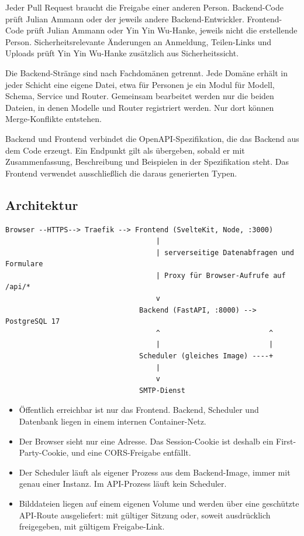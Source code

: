 \documentclass[11pt,a4paper]{article}
\renewcommand{\footnotesize}{\fontsize{10}{12}\selectfont}
\begin{document}
Jeder Pull Request braucht die Freigabe einer anderen Person. Backend-Code prüft Julian Ammann oder der jeweils andere Backend-Entwickler. Frontend-Code prüft Julian Ammann oder Yin Yin Wu-Hanke, jeweils nicht die erstellende Person. Sicherheitsrelevante Änderungen an Anmeldung, Teilen-Links und Uploads prüft Yin Yin Wu-Hanke zusätzlich aus Sicherheitssicht.

Die Backend-Stränge sind nach Fachdomänen getrennt. Jede Domäne erhält in jeder Schicht eine eigene Datei, etwa für Personen je ein Modul für Modell, Schema, Service und Router. Gemeinsam bearbeitet werden nur die beiden Dateien, in denen Modelle und Router registriert werden. Nur dort können Merge-Konflikte entstehen.

Backend und Frontend verbindet die OpenAPI-Spezifikation, die das Backend aus dem Code erzeugt. Ein Endpunkt gilt als übergeben, sobald er mit Zusammenfassung, Beschreibung und Beispielen in der Spezifikation steht. Das Frontend verwendet ausschließlich die daraus generierten Typen.

\subsection{Architektur}

{\footnotesize
\begin{verbatim}
Browser --HTTPS--> Traefik --> Frontend (SvelteKit, Node, :3000)
                                    |
                                    | serverseitige Datenabfragen und Formulare
                                    | Proxy für Browser-Aufrufe auf /api/*
                                    v
                                Backend (FastAPI, :8000) --> PostgreSQL 17
                                    ^                          ^
                                    |                          |
                                Scheduler (gleiches Image) ----+
                                    |
                                    v
                                SMTP-Dienst
\end{verbatim}
}

\begin{itemize}
\item Öffentlich erreichbar ist nur das Frontend. Backend, Scheduler und Datenbank liegen in einem internen Container-Netz.
\item Der Browser sieht nur eine Adresse. Das Session-Cookie ist deshalb ein First-Party-Cookie, und eine CORS-Freigabe entfällt.
\item Der Scheduler läuft als eigener Prozess aus dem Backend-Image, immer mit genau einer Instanz. Im API-Prozess läuft kein Scheduler.
\item Bilddateien liegen auf einem eigenen Volume und werden über eine geschützte API-Route ausgeliefert: mit gültiger Sitzung oder, soweit ausdrücklich freigegeben, mit gültigem Freigabe-Link.
\end{itemize}
\end{document}
